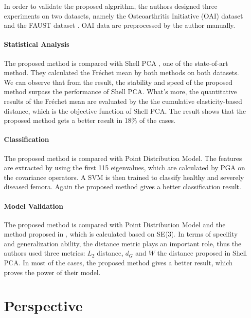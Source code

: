 \documentclass[11pt]{article}
\begin{document}
In order to validate the proposed algprithm, the authors designed three experiments on two datasets, namely the Osteoarthritis Initiative (OAI) dataset and the FAUST dataset \cite{bogo2014faust}.
OAI data are preprocessed by the author manually.

\paragraph{Statistical Analysis}

The proposed method is compared with Shell PCA \cite{zhang2015shell}, one of the state-of-art method. They calculated the Fréchet mean by both methods on both datasets.
We can observe that from the result, the stability and speed of the proposed method surpass the performance of Shell PCA. What's more, the quantitative results of the Fréchet mean are evaluated by the the cumulative elasticity-based distance, which is the objective function of Shell PCA.
The result shows that the proposed method gets a better result in 18\% of the cases.


\paragraph{Classification}

The proposed method is compared with Point Distribution Model. The features are extracted by using the first 115 eigenvalues, which are calculated by PGA on the covariance operators.
A SVM is then trained to classify healthy and severely diseased femora. Again the proposed method gives a better classification result.


\paragraph{Model Validation}

The proposed method is compared with Point Distribution Model and the method proposed in \cite{hefny2015liver}, which is calculated based on SE(3).
In terms of specifity and generalization ability, the distance metric plays an important role, thus the authors used three metrics: $L_2$ distance, $d_G$ and $W$ the distance proposed in Shell PCA.
In most of the cases, the proposed method gives a better result, which proves the power of their model.


\section{Perspective}
\end{document}
